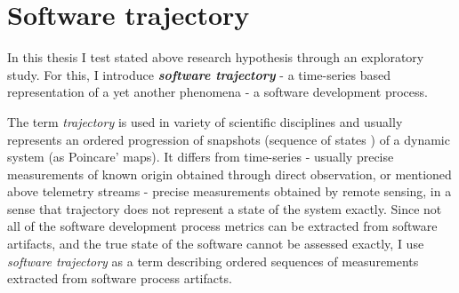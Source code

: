\section{Software trajectory}\label{section_trajectory_definition}
In this thesis I test stated above research hypothesis through an exploratory study. For this, I introduce 
\textit{\textbf{software trajectory}} - a time-series based representation of a yet another phenomena 
- a software development process. 

The term \textit{trajectory} is used in variety of scientific disciplines and usually represents 
an ordered progression of snapshots (sequence of states ) of a dynamic system (as Poincare' maps). 
It differs from time-series - usually precise measurements of known origin obtained through direct 
observation, or mentioned above telemetry streams - precise measurements obtained by remote 
sensing, in a sense that trajectory does not represent a state of the system exactly. 
Since not all of the software development process metrics can be extracted from software artifacts, and the 
true state of the software cannot be assessed exactly, I use \textit{software trajectory} as a term describing 
ordered sequences of measurements extracted from software process artifacts.



